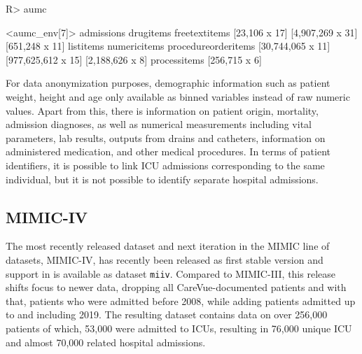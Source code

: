 \documentclass[
  notitle,
  nojss,
  noheadings]{jss}
\begin{document}
\begin{CodeChunk}
\begin{CodeInput}
R> aumc
\end{CodeInput}
\begin{CodeOutput}
<aumc_env[7]>
         admissions           drugitems       freetextitems 
      [23,106 x 17]    [4,907,269 x 31]      [651,248 x 11] 
          listitems        numericitems procedureorderitems 
  [30,744,065 x 11]  [977,625,612 x 15]     [2,188,626 x 8] 
       processitems 
      [256,715 x 6] 
\end{CodeOutput}
\end{CodeChunk}

For data anonymization purposes, demographic information such as patient
weight, height and age only available as binned variables instead of raw
numeric values. Apart from this, there is information on patient origin,
mortality, admission diagnoses, as well as numerical measurements
including vital parameters, lab results, outputs from drains and
catheters, information on administered medication, and other medical
procedures. In terms of patient identifiers, it is possible to link ICU
admissions corresponding to the same individual, but it is not possible
to identify separate hospital admissions.

\hypertarget{mimic-iv}{%
\subsection{MIMIC-IV}\label{mimic-iv}}

The most recently released dataset and next iteration in the MIMIC line
of datasets, MIMIC-IV, has recently been released as first stable
version \citep{johnson2021} and support in  is available as
dataset \texttt{miiv}. Compared to MIMIC-III, this release shifts focus
to newer data, dropping all CareVue-documented patients and with that,
patients who were admitted before 2008, while adding patients admitted
up to and including 2019. The resulting dataset contains data on over
256,000 patients of which, 53,000 were admitted to ICUs, resulting in
76,000 unique ICU and almost 70,000 related hospital admissions.
\end{document}
